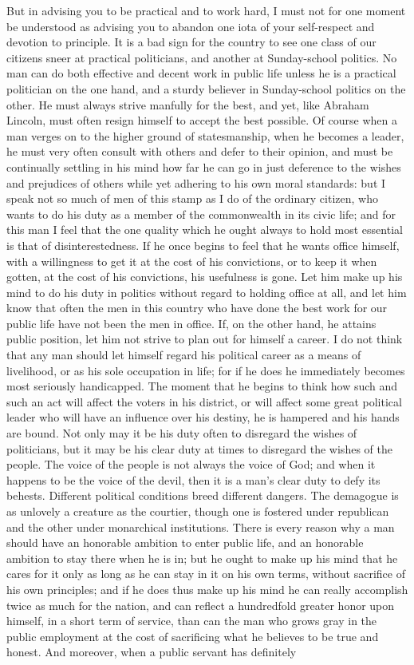 \documentclass[a4paper]{amsbook}
\begin{document}
But in advising you to be practical and to work hard, I must not for one moment be understood as advising you to abandon one iota of your self-respect and devotion to principle. It is a bad sign for the country to see one class of our citizens sneer at practical politicians, and another at Sunday-school politics. No man can do both effective and decent work in public life unless he is a practical politician on the one hand, and a sturdy believer in Sunday-school politics on the other. He must always strive manfully for the best, and yet, like Abraham Lincoln, must often resign himself to accept the best possible. Of course when a man verges on to the higher ground of statesmanship, when he becomes a leader, he must very often consult with others and defer to their opinion, and must be continually settling in his mind how far he can go in just deference to the wishes and prejudices of others while yet adhering to his own moral standards: but I speak not so much of men of this stamp as I do of the ordinary citizen, who wants to do his duty as a member of the commonwealth in its civic life; and for this man I feel that the one quality which he ought always to hold most essential is that of disinterestedness. If he once begins to feel that he wants office himself, with a willingness to get it at the cost of his convictions, or to keep it when gotten, at the cost of his convictions, his usefulness is gone. Let him make up his mind to do his duty in politics without regard to holding office at all, and let him know that often the men in this country who have done the best work for our public life have not been the men in office. If, on the other hand, he attains public position, let him not strive to plan out for himself a career. I do not think that any man should let himself regard his political career as a means of livelihood, or as his sole occupation in life; for if he does he immediately becomes most seriously handicapped. The moment that he begins to think how such and such an act will affect the voters in his district, or will affect some great political leader who will have an influence over his destiny, he is hampered and his hands are bound. Not only may it be his duty often to disregard the wishes of politicians, but it may be his clear duty at times to disregard the wishes of the people. The voice of the people is not always the voice of God; and when it happens to be the voice of the devil, then it is a man's clear duty to defy its behests. Different political conditions breed different dangers. The demagogue is as unlovely a creature as the courtier, though one is fostered under republican and the other under monarchical institutions. There is every reason why a man should have an honorable ambition to enter public life, and an honorable ambition to stay there when he is in; but he ought to make up his mind that he cares for it only as long as he can stay in it on his own terms, without sacrifice of his own principles; and if he does thus make up his mind he can really accomplish twice as much for the nation, and can reflect a hundredfold greater honor upon himself, in a short term of service, than can the man who grows gray in the public employment at the cost of sacrificing what he believes to be true and honest. And moreover, when a public servant has definitely 
\end{document}
